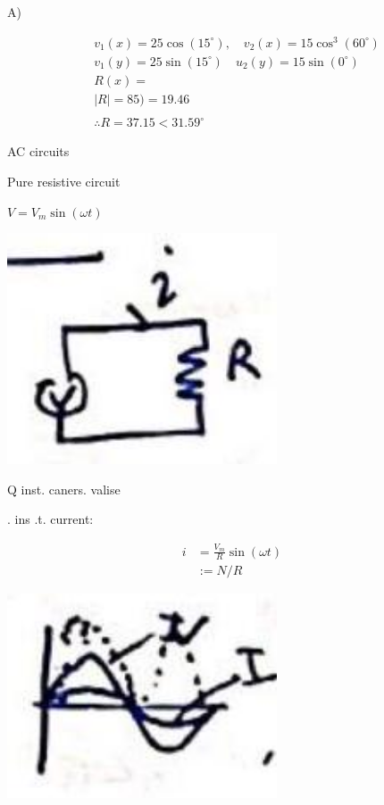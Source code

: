 \documentclass[12pt, a4paper]{article}
\newcommand{\figwidth}{8cm}
\begin{document}
	A)

	$$
		\begin{aligned}
			 & v_{1}(x)=25 \cos \left(15^{\circ}\right), \quad v_{2}(x)=15 \cos ^{3}\left(60^{\circ}\right) \\
			 & v_{1}(y)=25 \sin \left(15^{\circ}\right) \quad u_{2}(y)=15 \sin \left(0^{\circ}\right)       \\
			 & R(x)=                                                                                        \\
			 & |R|=85)=19.46                                                                                \\
			 &                                                                                              \\
			 & \therefore R=37.15<31.59^{\circ}
		\end{aligned}
	$$

	AC circuits

	Pure resistive circuit

$V=V_{m} \sin (\omega t)$

	\begin{center}
		\includegraphics[max width=\figwidth]{2024_06_15_74bbabba7981675b0d49g-05(1)}
	\end{center}

	Q inst. caners. valise

	. ins .t. current:

	$$
		\begin{aligned}
			i & =\frac{V_{m}}{R} \sin (\omega t) \\
			  & :=N / R
		\end{aligned}
	$$

	\begin{center}
		\includegraphics[max width=\figwidth]{2024_06_15_74bbabba7981675b0d49g-05}
	\end{center}
\end{document}
